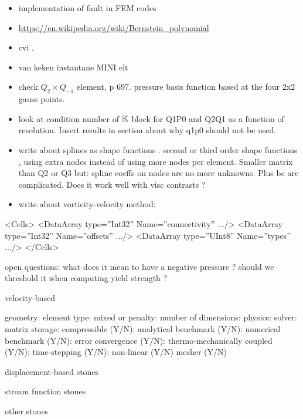 \begin{itemize}
\item implementation of fault in FEM codes \cite{zhgu94,zhgu95}
\item \url{https://en.wikipedia.org/wiki/Bernstein_polynomial}
\item cvi \cite{pukp16},\cite{mcna11}
\item van keken instantane MINI elt
\item check $Q_2 \times Q_{-1}$ element, \cite{grsa} p 697. pressure basis function based at the four 2x2 gauss points.
\item look at condition number of ${\mathbb{K}}$ block for Q1P0 and Q2Q1 as a function of resolution. Insert results in section about why q1p0 should not be used. 
\item write about splines as shape functions \cite{chri92}. second or third order shape functions , using extra nodes instead of using more nodes per element. Smaller matrix than Q2 or Q3 but: spline coeffs on nodes are no more unknowns. Plus bc are complicated. Does it work well with visc contrasts ?

\item write about vorticity-velocity method: \cite{gats91,gust93,dehu95,ergq99}

\end{itemize}

 <Cells>
      <DataArray type=”Int32” Name=”connectivity” .../>
      <DataArray type=”Int32” Name=”offsets” .../>
      <DataArray type=”UInt8” Name=”types” .../>
    </Cells>


open questions:
what does it mean to have a negative pressure ? should we threshold it when computing yield strength ? 


velocity-based

geometry:
element type:
mixed or penalty: 
number of dimensions:
physics: 
solver:
matrix storage: 
compressible (Y/N): 
analytical benchmark (Y/N): 
numerical benchmark (Y/N):
error convergence (Y/N):
thermo-mechanically coupled (Y/N):
time-stepping (Y/N):
non-linear (Y/N)
mesher (Y/N)

displacement-based stones


stream function stones 

other stones


